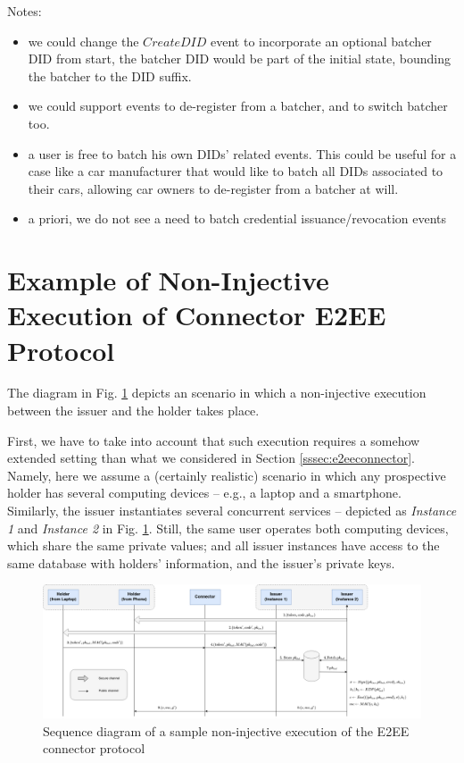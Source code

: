 \documentclass[10pt,a4paper]{article}
\newcommand{\figref}[1]{Fig. \ref{#1}}
\newcommand{\secref}[1]{Section \ref{#1}}
\begin{document}
Notes:
\begin{itemize}
\item we could change the $CreateDID$ event to incorporate an optional batcher DID from start, the batcher DID would be part of the initial state, 
      bounding the batcher to the DID suffix. 
\item we could support events to de-register from a batcher, and to switch batcher too.
\item a user is free to batch his own DIDs' related events. This could be useful for a case like a car manufacturer that would like to batch all DIDs
      associated to their cars, allowing car owners to de-register from a batcher at will.
\item a priori, we do not see a need to batch credential issuance/revocation events
\end{itemize}

\appendix

\section{Example of Non-Injective Execution of Connector E2EE Protocol}
\label{app:non-inj-e2ee}

The diagram in \figref{fig:e2econnector-noninj} depicts an scenario in which a
non-injective execution between the issuer and the holder takes place.

First, we have to take into account that such execution requires a somehow
extended setting than what we considered in \secref{sssec:e2eeconnector}. Namely,
here we assume a (certainly realistic) scenario in which any prospective holder
has several computing devices -- e.g., a laptop and a smartphone. Similarly,
the issuer instantiates several concurrent services -- depicted as
\emph{Instance 1} and \emph{Instance 2} in \figref{fig:e2econnector-noninj}.
Still, the same user operates both computing devices, which share the same
private values; and all issuer instances have access to the same database with
holders' information, and the issuer's private keys.

\begin{figure}[ht!]
  \centering
  \includegraphics[scale=0.32]{figures/connector-noninjective.png}
  \caption{Sequence diagram of a sample non-injective execution of the E2EE
    connector protocol}
  \label{fig:e2econnector-noninj}%
\end{figure}
\end{document}

